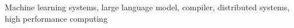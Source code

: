 \documentclass[11pt, a4paper]{awesome-cv}
\begin{document}
\makecvheader






\small{Machine learning systems, large language model, compiler, distributed systems, high performance computing}








%
%
%
%
%

\end{document}
